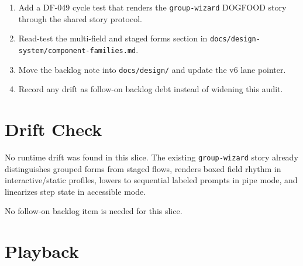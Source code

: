 \begin{enumerate}
\def\labelenumi{\arabic{enumi}.}
\tightlist
\item
  Add a DF-049 cycle test that renders the \texttt{g\allowbreak{}r\allowbreak{}o\allowbreak{}u\allowbreak{}p\allowbreak{}-\allowbreak{}w\allowbreak{}i\allowbreak{}z\allowbreak{}a\allowbreak{}r\allowbreak{}d} DOGFOOD story through the shared story protocol.
\item
  Read-test the multi-field and staged forms section in \texttt{d\allowbreak{}o\allowbreak{}c\allowbreak{}s\allowbreak{}/\allowbreak{}d\allowbreak{}e\allowbreak{}s\allowbreak{}i\allowbreak{}g\allowbreak{}n\allowbreak{}-\allowbreak{}s\allowbreak{}y\allowbreak{}s\allowbreak{}t\allowbreak{}e\allowbreak{}m\allowbreak{}/\allowbreak{}c\allowbreak{}o\allowbreak{}m\allowbreak{}p\allowbreak{}o\allowbreak{}n\allowbreak{}e\allowbreak{}n\allowbreak{}t\allowbreak{}-\allowbreak{}f\allowbreak{}a\allowbreak{}m\allowbreak{}i\allowbreak{}l\allowbreak{}i\allowbreak{}e\allowbreak{}s\allowbreak{}.\allowbreak{}m\allowbreak{}d}.
\item
  Move the backlog note into \texttt{d\allowbreak{}o\allowbreak{}c\allowbreak{}s\allowbreak{}/\allowbreak{}d\allowbreak{}e\allowbreak{}s\allowbreak{}i\allowbreak{}g\allowbreak{}n\allowbreak{}/} and update the v6 lane pointer.
\item
  Record any drift as follow-on backlog debt instead of widening this audit.
\end{enumerate}

\section{Drift Check}\label{record-097-drift-check}

No runtime drift was found in this slice. The existing \texttt{g\allowbreak{}r\allowbreak{}o\allowbreak{}u\allowbreak{}p\allowbreak{}-\allowbreak{}w\allowbreak{}i\allowbreak{}z\allowbreak{}a\allowbreak{}r\allowbreak{}d} story already distinguishes grouped forms from staged flows, renders boxed field rhythm in interactive/static profiles, lowers to sequential labeled prompts in pipe mode, and linearizes step state in accessible mode.

No follow-on backlog item is needed for this slice.

\section{Playback}\label{record-097-playback}

